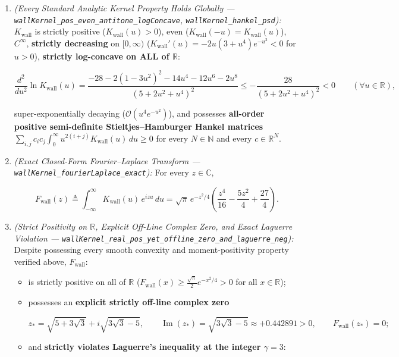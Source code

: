 \documentclass[
  11pt,
]{article}
\begin{document}
\begin{enumerate}
\def\labelenumi{\arabic{enumi}.}
\item
  \emph{(Every Standard Analytic Kernel Property Holds Globally ---
  \texttt{wallKernel\_pos\_even\_antitone\_logConcave},
  \texttt{wallKernel\_hankel\_psd}):} \(K_{\text{wall}}\) is strictly
  positive (\(K_{\text{wall}}(u) > 0\)), even
  (\(K_{\text{wall}}(-u) = K_{\text{wall}}(u)\)), \(C^\infty\),
  \textbf{strictly decreasing} on \([0, \infty)\)
  (\(K_{\text{wall}}'(u) = -2u(3 + u^4)e^{-u^2} < 0\) for \(u > 0\)),
  \textbf{strictly log-concave on ALL of \(\mathbb{R}\)}:

  \[\frac{d^2}{du^2}\ln K_{\text{wall}}(u) = \frac{-28 - 2(1 - 3u^2)^2 - 14u^4 - 12u^6 - 2u^8}{(5 + 2u^2 + u^4)^2} \le -\frac{28}{(5 + 2u^2 + u^4)^2} < 0 \qquad (\forall u \in \mathbb{R}),\]

  super-exponentially decaying (\(\mathcal{O}(u^4 e^{-u^2})\)), and
  possesses \textbf{all-order positive semi-definite
  Stieltjes--Hamburger Hankel matrices}
  \(\sum_{i,j} c_i c_j \int_0^\infty u^{2(i+j)} K_{\text{wall}}(u)\,du \ge 0\)
  for every \(N \in \mathbb{N}\) and every \(c \in \mathbb{R}^N\).
\item
  \emph{(Exact Closed-Form Fourier--Laplace Transform ---
  \texttt{wallKernel\_fourierLaplace\_exact}):} For every
  \(z \in \mathbb{C}\),

  \[F_{\text{wall}}(z) \triangleq \int_{-\infty}^{\infty} K_{\text{wall}}(u)\,e^{izu}\,du = \sqrt{\pi}\,e^{-z^2/4}\!\left(\frac{z^4}{16} - \frac{5z^2}{4} + \frac{27}{4}\right).\]
\item
  \emph{(Strict Positivity on \(\mathbb{R}\), Explicit Off-Line Complex
  Zero, and Exact Laguerre Violation ---
  \texttt{wallKernel\_real\_pos\_yet\_offline\_zero\_and\_laguerre\_neg}):}
  Despite possessing every smooth convexity and moment-positivity
  property verified above, \(F_{\text{wall}}\):

  \begin{itemize}
  \item
    is strictly positive on all of \(\mathbb{R}\)
    (\(F_{\text{wall}}(x) \ge \frac{\sqrt{\pi}}{2}e^{-x^2/4} > 0\) for
    all \(x \in \mathbb{R}\));
  \item
    possesses an \textbf{explicit strictly off-line complex zero}

    \[z_* = \sqrt{5 + 3\sqrt{3}} + i\sqrt{3\sqrt{3} - 5}, \qquad \operatorname{Im}(z_*) = \sqrt{3\sqrt{3} - 5} \approx +0.442891 > 0, \qquad F_{\text{wall}}(z_*) = 0;\]
  \item
    and \textbf{strictly violates Laguerre's inequality at the integer
    \(\gamma = 3\)}:


\end{itemize}
\end{enumerate}
\end{document}
